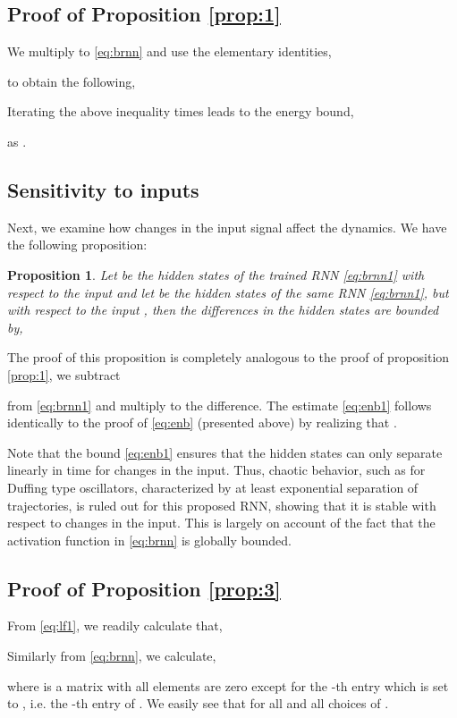 \documentclass{article} \usepackage{iclr2021_conference,times}
\newtheorem{proposition}[theorem]{Proposition}
\begin{document}
\subsection{Proof of Proposition \ref{prop:1}}
\label{app:proof_energy_bound}
We multiply  to \eqref{eq:brnn} and use the elementary identities,

to obtain the following,
 
Iterating the above inequality  times leads to the energy bound,

as .
\subsection{Sensitivity to inputs}
\label{app:input_stable}
Next, we examine how changes in the input signal  affect the dynamics. We have the following proposition:
\begin{proposition}
\label{prop:2}
Let  be the hidden states of the trained RNN \eqref{eq:brnn1} with respect to the input  and let  be the hidden states of the same RNN \eqref{eq:brnn1}, but with respect to the input , then the differences in the hidden states are bounded by,

\end{proposition}
The proof of this proposition is completely analogous to the proof of proposition \ref{prop:1}, we subtract 

from \eqref{eq:brnn1} and multiply  to the difference. The estimate \eqref{eq:enb1} follows identically to the proof of \eqref{eq:enb} (presented above) by realizing that .

Note that the bound \eqref{eq:enb1} ensures that the hidden states can only separate linearly in time for changes in the input. Thus, chaotic behavior, such as for Duffing type oscillators, characterized by at least exponential separation of trajectories, is ruled out for this proposed RNN, showing that it is stable with respect to changes in the input. This is largely on account of the fact that the activation function  in \eqref{eq:brnn} is globally bounded. 
\subsection{Proof of Proposition \ref{prop:3}}
\label{app:proof_explod}
From \eqref{eq:lf1}, we readily calculate that,

Similarly from \eqref{eq:brnn}, we calculate,

where  is a matrix with all elements are zero except for the -th entry which is set to , i.e. the -th entry of . We easily see that  for all  and all choices of . 
\end{document}
